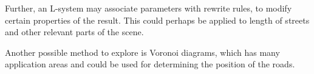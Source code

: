 Further, an L-system may associate parameters with rewrite rules, to modify certain properties of the result\cite{graphical_l-systems}. This could perhaps be applied to length of streets and other relevant parts of the scene.

Another possible method to explore is Voronoi diagrams, which has many application areas and could be used for determining the position of the roads.




